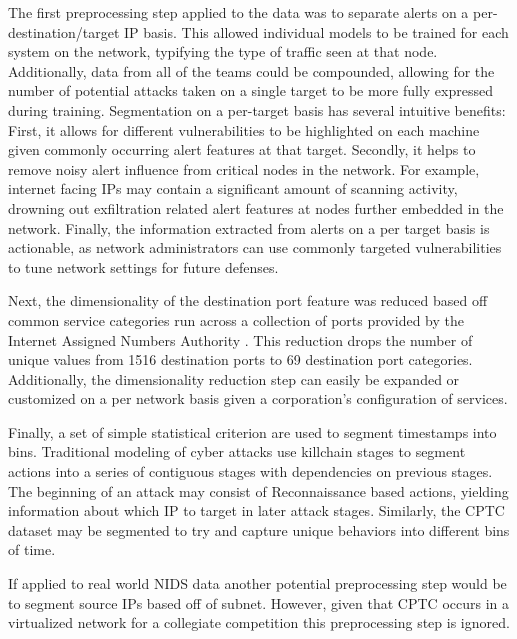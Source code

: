 The first preprocessing step applied to the data was to separate alerts on a per-destination/target IP basis. This allowed individual models to be trained for each system on the network, typifying the type of traffic seen at that node. Additionally, data from all of the teams could be compounded, allowing for the number of potential attacks taken on a single target to be more fully expressed during training. Segmentation on a per-target basis has several intuitive benefits: First, it allows for different vulnerabilities to be highlighted on each machine given commonly occurring alert features at that target. Secondly, it helps to remove noisy alert influence from critical nodes in the network. For example, internet facing IPs may contain a significant amount of scanning activity, drowning out exfiltration related alert features at nodes further embedded in the network. Finally, the information extracted from alerts on a per target basis is actionable, as network administrators can use commonly targeted vulnerabilities to tune network settings for future defenses. 


Next, the dimensionality of the destination port feature was reduced based off common service categories run across a collection of ports provided by the Internet Assigned Numbers Authority \cite{iana}. This reduction drops the number of unique values from 1516 destination ports to 69 destination port categories. Additionally, the dimensionality reduction step can easily be expanded or customized on a per network basis given a corporation's configuration of services. 



Finally, a set of simple statistical criterion are used to segment timestamps into bins. Traditional modeling of cyber attacks use killchain stages to segment actions into a series of contiguous stages with dependencies on previous stages. The beginning of an attack may consist of Reconnaissance based actions, yielding information about which IP to target in later attack stages. Similarly, the CPTC dataset may be segmented to try and capture unique behaviors into different bins of time. 

If applied to real world NIDS data another potential preprocessing step would be to segment source IPs based off of subnet. However, given that CPTC occurs in a virtualized network for a collegiate competition this preprocessing step is ignored. 

